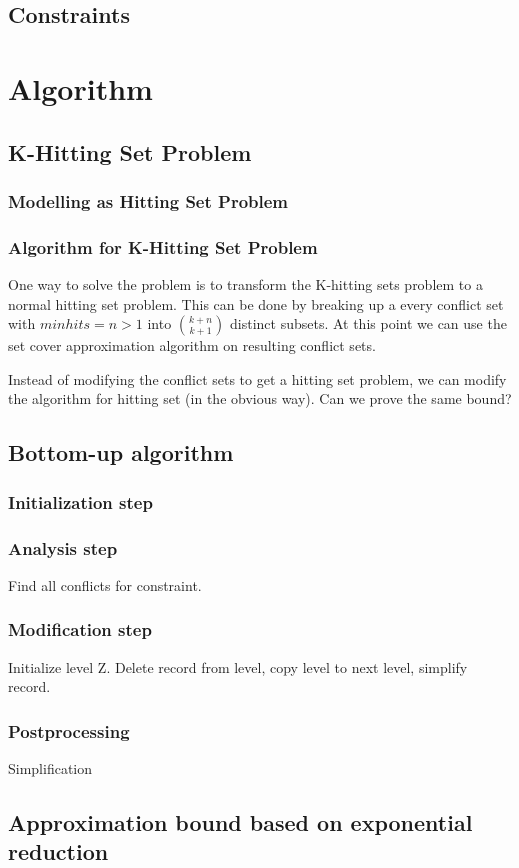 \subsection{Constraints}






\section{Algorithm}

\subsection{K-Hitting Set Problem}

\subsubsection{Modelling as Hitting Set Problem}


\subsubsection{Algorithm for K-Hitting Set Problem}

One way to solve the problem is to transform the K-hitting sets problem to a normal hitting set problem. This can be done by breaking up a every conflict set with $minhits=n>1$ into $k+n \choose k+1$ distinct subsets. At this point we can use the set cover approximation algorithm on resulting conflict sets.

Instead of modifying the conflict sets to get a hitting set problem, we can modify the algorithm for hitting set (in the obvious way). Can we prove the same bound?

\subsection{Bottom-up algorithm}

\subsubsection{Initialization step}

\subsubsection{Analysis step}

Find all conflicts for constraint.

\subsubsection{Modification step}

Initialize level Z. Delete record from level, copy level to next level, simplify record.

\subsubsection{Postprocessing}

Simplification


\subsection{Approximation bound based on exponential reduction}